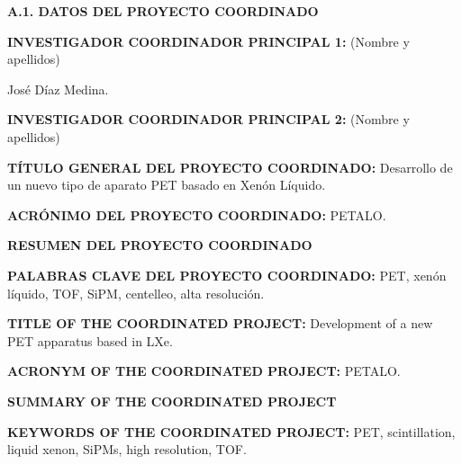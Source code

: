 \documentclass[a4paper,11pt,oneside]{article}
\begin{document}

\noindent\textbf{A.1. DATOS DEL PROYECTO COORDINADO}
\vspace{6pt}

\noindent\textbf{INVESTIGADOR COORDINADOR PRINCIPAL 1:} (Nombre y apellidos)

\noindent José Díaz Medina.
\vspace{6pt}

\noindent\textbf{INVESTIGADOR COORDINADOR PRINCIPAL 2:} (Nombre y apellidos)

\noindent 
\vspace{6pt}

\noindent\textbf{TÍTULO GENERAL DEL PROYECTO COORDINADO:} Desarrollo de un nuevo tipo de aparato PET basado en Xenón Líquido.
\vspace{6pt}

\noindent\textbf{ACRÓNIMO DEL PROYECTO COORDINADO:} PETALO.


\noindent\textbf{RESUMEN DEL PROYECTO COORDINADO} 
{\color{blue}{M\'aximo 3500 caracteres (incluyendo espacios en blanco):}}
\vspace{12pt}


 
\vspace{12pt}

\noindent\textbf{PALABRAS CLAVE DEL PROYECTO COORDINADO:} PET, xenón líquido, TOF, SiPM, centelleo, alta resolución.

\vspace{12pt}

\noindent\textbf{TITLE OF THE COORDINATED PROJECT:} Development of a new PET apparatus based in LXe. 
\vspace{6pt}

\noindent\textbf{ACRONYM OF THE COORDINATED PROJECT:} PETALO.
\vspace{6pt}

\noindent\textbf{SUMMARY OF THE COORDINATED PROJECT} 
\vspace{6pt}



 \vspace{12pt}

\noindent\textbf{KEYWORDS OF THE COORDINATED PROJECT:} PET, scintillation, liquid xenon, SiPMs, high resolution, TOF.  
\end{document}
